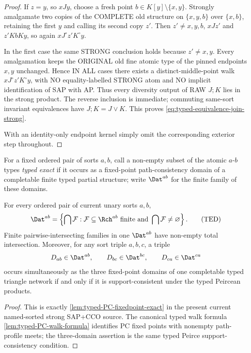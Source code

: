 \begin{proof}
If \(z=y\), so \(xJy\),
choose a fresh point
\(b\in K[y]\setminus\{x,y\}\).
Strongly amalgamate two copies
of the COMPLETE old structure
on \(\{x,y,b\}\) over
\(\{x,b\}\), retaining the
first \(y\) and calling its
second copy \(z'\).
Then \(z'\ne x,y,b\),
\(xJz'\) and \(z'KbKy\),
so again \(xJ^\circ z'K^\circ y\).

In the first case the same
STRONG conclusion holds because
\(z'\ne x,y\). Every amalgamation
keeps the ORIGINAL old fine
atomic type of the pinned
endpoints \(x,y\) unchanged.
Hence IN ALL cases there exists
a distinct-middle-point walk
\(xJ^\circ z'K^\circ y\),
with NO equality-labelled
STRONG atom and NO implicit
identification of SAP with AP.
Thus every diversity
output of RAW \(J;K\)
lies in the strong product.
The reverse inclusion
is immediate; commuting
same-sort invariant
equivalences have
\(J;K=J\vee K\).
This proves
\eqref{eq:typed-equivalence-join-strong}.

With an identity-only
endpoint kernel simply omit
the corresponding exterior
step throughout.
\end{proof}

For a fixed ordered pair of sorts \(a,b\), call a non-empty subset of the
atomic \(a\)-\(b\) types \emph{typed exact} if it occurs as a fixed-point
path-consistency domain of a completable finite typed partial structure; write
\(\Dat^{ab}\) for the finite family of these domains.

\begin{lemma}
\label{lem:typed-exact-domain-calculus}
For every ordered pair of current unary sorts \(a,b\),
\[
 \Dat^{ab}
 =\left\{\bigcap\mathcal F:
   \mathcal F\subseteq\Rch^{ab}\text{ finite and }
   \bigcap\mathcal F\ne\varnothing\right\}.
\tag{TED}\label{eq:typed-exact-domains}
\]
Finite pairwise-intersecting families in one \(\Dat^{ab}\) have non-empty
total intersection.  Moreover, for any sort triple \(a,b,c\), a triple
\[
 D_{ab}\in\Dat^{ab},\qquad
 D_{bc}\in\Dat^{bc},\qquad
 D_{ca}\in\Dat^{ca}
\]
occurs simultaneously as the three fixed-point domains of one completable
typed triangle network if and only if it is support-consistent under the typed
Peircean products.
\end{lemma}

\begin{proof}
This is exactly \cref{lem:typed-PC-fixedpoint-exact}
in the present current named-sorted strong SAP+CCO
source. The canonical typed walk formula
\cref{lem:typed-PC-walk-formula} identifies PC
fixed points with nonempty path-profile meets;
the three-domain assertion is the same typed
Peirce support-consistency condition.
\end{proof}

